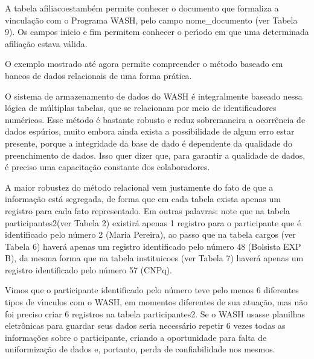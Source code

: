 \documentclass[
12pt,		%
openright,	%
twoside,  %
a4paper,			%
chapter=TITLE,		%
english,			%
french,				%
spanish,			%
brazil				%
]{USPSC-classe/USPSC}
\begin{document}
A tabela \textquotedbl afiliacoes\textquotedbl  tamb\'em permite conhecer o documento que formaliza a vincula\c{c}\~ao com o Programa WASH, pelo campo nome\_documento (ver Tabela 9). Os campos \textquotedbl inicio \textquotedbl  e \textquotedbl fim \textquotedbl  permitem conhecer o per\'{\i}odo em que uma determinada afilia\c{c}\~ao estava v\'alida.









O exemplo mostrado at\'e agora permite compreender o m\'etodo baseado em bancos de dados relacionais de uma forma pr\'atica.









O sistema de armazenamento de dados do WASH \'e integralmente baseado nessa l\'ogica de m\'ultiplas tabelas, que se relacionam por meio de identificadores num\'ericos. Esse m\'etodo \'e bastante robusto e reduz sobremaneira a ocorr\^encia de dados esp\'urios, muito embora ainda exista a possibilidade de algum erro estar presente, porque a integridade da base de dado \'e dependente da qualidade do preenchimento de dados. Isso quer dizer que, para garantir a qualidade de dados, \'e preciso uma capacita\c{c}\~ao constante dos colaboradores.









A maior robustez do m\'etodo relacional vem justamente do fato de que a informa\c{c}\~ao est\'a segregada, de forma que em cada tabela exista apenas um registro para cada fato representado. Em outras palavras: note que na tabela \textquotedbl participantes2\textquotedbl  (ver Tabela 2) existir\'a apenas 1 registro para o participante que \'e identificado pelo n\'umero 2 (Maria Pereira), ao passo que na tabela \textquotedbl cargos \textquotedbl  (ver Tabela 6) haver\'a apenas um registro identificado pelo n\'umero 48 (Bolsista EXP B), da mesma forma que na tabela \textquotedbl instituicoes \textquotedbl  (ver Tabela 7) haver\'a apenas um registro identificado pelo n\'umero 57 (CNPq).









Vimos que o participante identificado pelo n\'umero  \textquotedbl  teve  pelo menos 6 diferentes tipos de v\'{\i}nculos com o WASH, em momentos diferentes de sua atua\c{c}\~ao, mas n\~ao foi preciso criar 6 registros na tabela \textquotedbl participantes2\textquotedbl . Se o WASH usasse planilhas eletr\^onicas para guardar seus dados seria necess\'ario repetir 6 vezes todas as informa\c{c}\~oes sobre o participante, criando a oportunidade para falta de uniformiza\c{c}\~ao de dados e, portanto, perda de confiabilidade nos mesmos.
\end{document}
